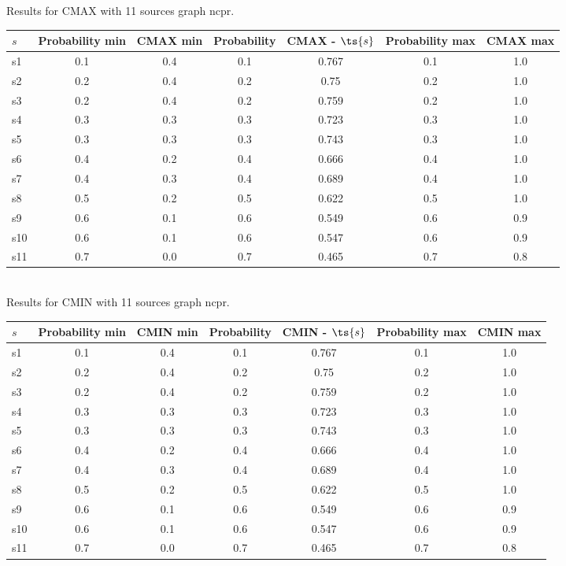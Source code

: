 \documentclass{article}
\begin{document}
\noindent Results for CMAX with 11 sources graph ncpr.

\noindent\begin{tabular}{|l|c|c|c|c|c|c|}
\hline
$s$& Probability min & CMAX min & Probability & CMAX - $\ts{s}$ & Probability max & CMAX max\\
\hline
s1 &0.1 & 0.4 & 0.1 & 0.767 & 0.1 & 1.0\\
\hline
s2 &0.2 & 0.4 & 0.2 & 0.75 & 0.2 & 1.0\\
\hline
s3 &0.2 & 0.4 & 0.2 & 0.759 & 0.2 & 1.0\\
\hline
s4 &0.3 & 0.3 & 0.3 & 0.723 & 0.3 & 1.0\\
\hline
s5 &0.3 & 0.3 & 0.3 & 0.743 & 0.3 & 1.0\\
\hline
s6 &0.4 & 0.2 & 0.4 & 0.666 & 0.4 & 1.0\\
\hline
s7 &0.4 & 0.3 & 0.4 & 0.689 & 0.4 & 1.0\\
\hline
s8 &0.5 & 0.2 & 0.5 & 0.622 & 0.5 & 1.0\\
\hline
s9 &0.6 & 0.1 & 0.6 & 0.549 & 0.6 & 0.9\\
\hline
s10 &0.6 & 0.1 & 0.6 & 0.547 & 0.6 & 0.9\\
\hline
s11 &0.7 & 0.0 & 0.7 & 0.465 & 0.7 & 0.8\\
\hline
\end{tabular}\\

\noindent Results for CMIN with 11 sources graph ncpr.

\noindent\begin{tabular}{|l|c|c|c|c|c|c|}
\hline
$s$& Probability min & CMIN min & Probability & CMIN - $\ts{s}$ & Probability max & CMIN max\\
\hline
s1 &0.1 & 0.4 & 0.1 & 0.767 & 0.1 & 1.0\\
\hline
s2 &0.2 & 0.4 & 0.2 & 0.75 & 0.2 & 1.0\\
\hline
s3 &0.2 & 0.4 & 0.2 & 0.759 & 0.2 & 1.0\\
\hline
s4 &0.3 & 0.3 & 0.3 & 0.723 & 0.3 & 1.0\\
\hline
s5 &0.3 & 0.3 & 0.3 & 0.743 & 0.3 & 1.0\\
\hline
s6 &0.4 & 0.2 & 0.4 & 0.666 & 0.4 & 1.0\\
\hline
s7 &0.4 & 0.3 & 0.4 & 0.689 & 0.4 & 1.0\\
\hline
s8 &0.5 & 0.2 & 0.5 & 0.622 & 0.5 & 1.0\\
\hline
s9 &0.6 & 0.1 & 0.6 & 0.549 & 0.6 & 0.9\\
\hline
s10 &0.6 & 0.1 & 0.6 & 0.547 & 0.6 & 0.9\\
\hline
s11 &0.7 & 0.0 & 0.7 & 0.465 & 0.7 & 0.8\\
\hline
\end{tabular}\\
\end{document}
